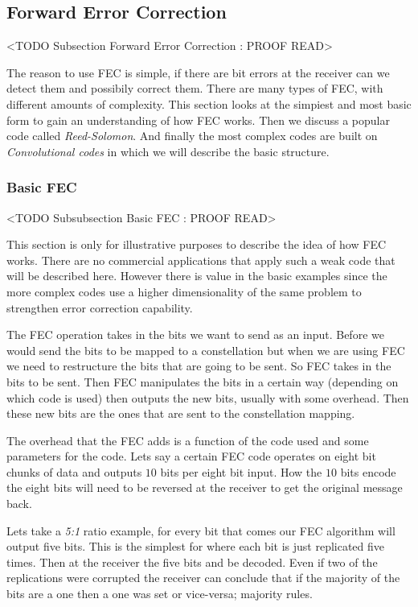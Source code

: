 \subsection{Forward Error Correction}
	<TODO Subsection Forward Error Correction : PROOF READ>

The reason to use \ac{FEC} is simple, if there are bit errors at the receiver can we detect them and possibily correct them. There are many types of \ac{FEC}, with different amounts of complexity. This section looks at the simpiest and most basic form to gain an understanding of how \ac{FEC} works. Then we discuss a popular code called \emph{Reed-Solomon}. And finally the most complex codes are built on \emph{Convolutional codes} in which we will describe the basic structure. 
	
	
\subsubsection{Basic FEC}
	<TODO Subsubsection  Basic FEC : PROOF READ>

This section is only for illustrative purposes to describe the idea of how \ac{FEC} works. There are no commercial applications that apply such a weak code that will be described here. However there is value in the basic examples since the more complex codes use a higher dimensionality of the same problem to strengthen error correction capability.

The \ac{FEC} operation takes in the bits we want to send as an input. Before we would send the bits to be mapped to a constellation but when we are using \ac{FEC} we need to restructure the bits that are going to be sent. So \ac{FEC} takes in the bits to be sent. Then \ac{FEC} manipulates the bits in a certain way (depending on which code is used) then outputs the new bits, usually with some overhead. Then these new bits are the ones that are sent to the constellation mapping.

The overhead that the \ac{FEC} adds is a function of the code used and some parameters for the code. Lets say a certain \ac{FEC} code operates on eight bit chunks of data and outputs $10$ bits per eight bit input. How the $10$ bits encode the eight bits will need to be reversed at the receiver to get the original message back.  

Lets take a \emph{5:1} ratio example, for every bit that comes our \ac{FEC} algorithm will output five bits. This is the simplest for where each bit is just replicated five times. Then at the receiver the five bits and be decoded. Even if two of the replications were corrupted the receiver can conclude that if the majority of the bits are a one then a one was set or vice-versa; majority rules.

